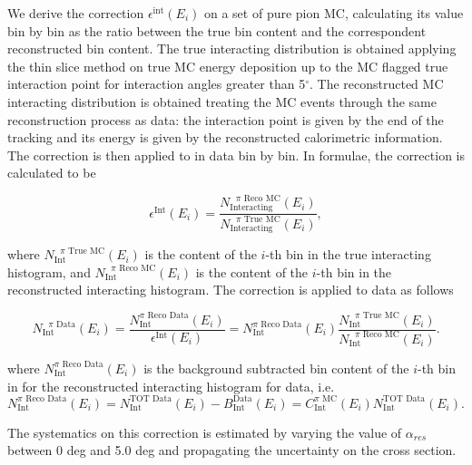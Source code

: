 We derive the correction $\epsilon^{\text{int}}(E_i)$ on a set of pure pion MC, calculating its value bin by bin as the ratio between the true bin content and the correspondent reconstructed bin content. The true interacting distribution is obtained applying the thin slice method on true MC energy deposition up to the MC flagged true interaction point for interaction angles greater than 5$^\circ$. The reconstructed MC interacting distribution is obtained treating the MC events through the same reconstruction process as data: the interaction point is given by the end of the tracking and its energy is given by the reconstructed calorimetric information. The correction is then applied to in data bin by bin. In formulae, the correction is calculated to be

\begin{equation}
 \epsilon^{\text{Int}}(E_i)  =  \frac{N^{\text{ $\pi$ Reco MC}}_{\text{Interacting}} (E_{i})}{ N^{\text{ $\pi$ True MC}}_{\text{Interacting}} (E_{i})  },
\end{equation}
 
where $N^{\text{ $\pi$ True MC}}_{\text{Int}} (E_{i}) $ is the content of the $i$-th bin in the true interacting histogram, and $N^{\text{ $\pi$ Reco MC}}_{\text{Int}} (E_{i}) $ is the content of the $i$-th bin in the reconstructed interacting histogram. The correction is applied to data as follows

\begin{equation}
N^{\text{ $\pi$  Data}}_{\text{Int}} (E_{i})  =  \frac{N^{\text{$\pi$ Reco Data}}_{\text{Int}} (E_{i})}{\epsilon^{\text{Int}} (E_{i}) } = N^{\text{$\pi$ Reco Data}}_{\text{Int}} (E_{i}) \frac{N^{\text{ $\pi$ True MC}}_{\text{Int}} (E_{i})}{ N^{\text{ $\pi$ Reco MC}}_{\text{Int}} (E_{i})}.
\end{equation}

where $N^{\text{$\pi$ Reco Data}}_{\text{Int}} (E_{i})$ is the background subtracted bin content of the $i$-th bin in for the reconstructed interacting histogram for data, i.e. 
\begin{equation}
N^{\text{$\pi$ Reco Data}}_{\text{Int}} (E_{i}) =  N^{\text{TOT Data}}_{\text{Int}} (E_{i}) - B^{\text{Data}}_{\text{Int}} (E_i)  =  C^{\text{$\pi$ MC}}_{\text{Int}} (E_{i}) N^{\text{TOT Data}}_{\text{Int}} (E_{i}).
\end{equation}


The systematics on this correction is estimated by varying the value of $\alpha_{res}$ between 0 deg and 5.0 deg and propagating the uncertainty on the cross section. 


